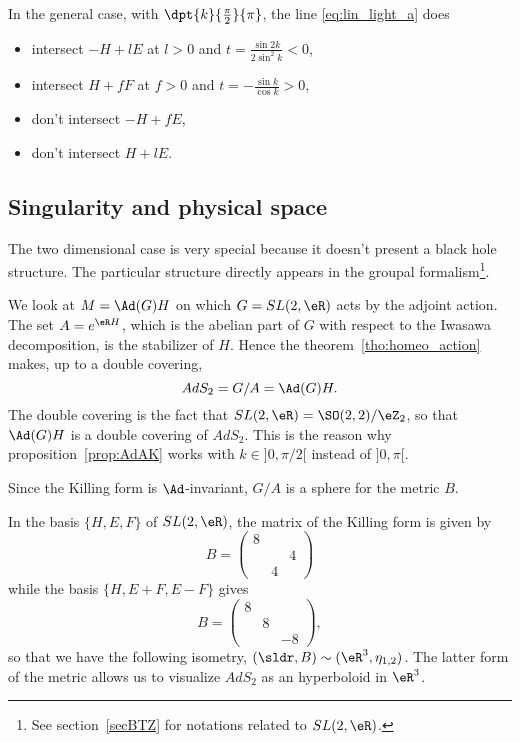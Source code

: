 In the general case, with $\dpt{k}{\frac{\pi}{2}}{\pi}$, the line \eqref{eq:lin_light_a} does

\begin{itemize}
	\item intersect $-H+lE$ at $l>0$ and $t=\frac{\sin 2k}{2\sin^2k}<0$,
	\item intersect $H+fF$ at $f>0$ and $t=-\frac{\sin k}{\cos k}>0$,
	\item don't intersect $-H+fE$,
	\item don't intersect $H+lE$.
\end{itemize}


\subsection{Singularity and physical space}

The two dimensional case is very special because it doesn't present a black hole structure. The particular structure directly appears in the groupal formalism\footnote{See section~\ref{secBTZ} for notations related to $SL(2,\eR)$.}.

We look at $M=\Ad(G)H$ on which $G=SL(2,\eR)$ acts by the adjoint action. The set $A=e^{\eR H}$, which is the abelian part of $G$ with respect to the Iwasawa decomposition, is the stabilizer of $H$. Hence the theorem~\ref{tho:homeo_action} makes, up to a double covering,
\begin{equation}
	AdS_2=G/A=\Ad(G)H.
\end{equation}
The double covering is the fact that $SL(2,\eR)=\SO(2,2)/\eZ_2$, so that $\Ad(G)H$ is a double covering of $AdS_2$. This is the reason why proposition~\ref{prop:AdAK} works with $k\in]0,\pi/2[$ instead of $]0,\pi[$.

Since the Killing form is $\Ad$-invariant, $G/A$ is a sphere for the metric $B$.

In the basis $\{H,E,F\}$ of $SL(2,\eR)$, the matrix of the Killing form is given by
\begin{equation}
	B=
	\begin{pmatrix}
		8 &   &   \\
		  &   & 4 \\
		  & 4 &
	\end{pmatrix}
\end{equation}
while the basis  $\{H,E+F,E-F\}$ gives
\[
	B=
	\begin{pmatrix}
		8         \\
		 & 8      \\
		 &   & -8
	\end{pmatrix},
\]
so that we have the following isometry, $(\sldr,B)\sim(\eR^3,\eta_{1,2})$. The latter form of the metric allows us to visualize $AdS_2$ as an hyperboloid in $\eR^3$.

